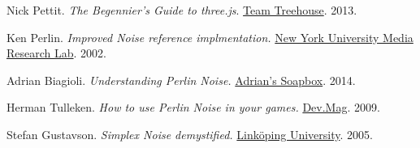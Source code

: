 
\vspace{0.5cm}
Nick Pettit. \textit{The Begennier's Guide to three.js}. \href{http://blog.teamtreehouse.com/the-beginners-guide-to-three-js}{Team Treehouse}. 2013.

\vspace{0.5cm}
Ken Perlin. \textit{Improved Noise reference implmentation.} \href{http://mrl.nyu.edu/~perlin/noise/}{New York University Media Research Lab}. 2002.

\vspace{0.5cm}
Adrian Biagioli. \textit{Understanding Perlin Noise.} \href{https://flafla2.github.io/2014/08/09/perlinnoise.html}{Adrian's Soapbox}. 2014.

\vspace{0.5cm}
Herman Tulleken. \textit{How to use Perlin Noise in your games.} \href{http://devmag.org.za/2009/04/25/perlin-noise/}{Dev.Mag}. 2009.

\vspace{0.5cm}
Stefan Gustavson. \textit{Simplex Noise demystified.} \href{http://staffwww.itn.liu.se/~stegu/simplexnoise/simplexnoise.pdf}{Linköping University}. 2005.

